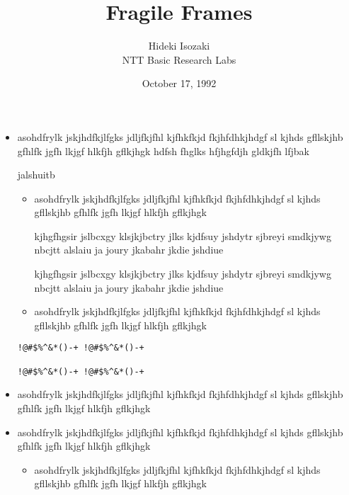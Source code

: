 
\title{Fragile Frames}

\author{Hideki Isozaki\\NTT Basic Research Labs} 

\date{October 17, 1992}




\maketitle

\begin{itemize}
\item asohdfrylk jskjhdfkjlfgks jdljfkjfhl kjfhkfkjd fkjhfdhkjhdgf
sl kjhds gfllskjhb gfhlfk jgfh lkjgf hlkfjh gflkjhgk
hdfsh fhglks hfjhgfdjh gldkjfh lfjbak

\begin{breakbox}
jalshuitb
\begin{itemize}
\item asohdfrylk jskjhdfkjlfgks jdljfkjfhl kjfhkfkjd fkjhfdhkjhdgf
sl kjhds gfllskjhb gfhlfk jgfh lkjgf hlkfjh gflkjhgk

\begin{breakbox}
kjhgfhgsir jslbcxgy klsjkjbctry jlks kjdfsuy
jshdytr sjbreyi smdkjywg nbcjtt alslaiu ja
joury jkabahr jkdie jshdiue

kjhgfhgsir jslbcxgy klsjkjbctry jlks kjdfsuy
jshdytr sjbreyi smdkjywg nbcjtt alslaiu ja
joury jkabahr jkdie jshdiue
\end{breakbox}

\item asohdfrylk jskjhdfkjlfgks jdljfkjfhl kjfhkfkjd fkjhfdhkjhdgf
sl kjhds gfllskjhb gfhlfk jgfh lkjgf hlkfjh gflkjhgk
\end{itemize}
\begin{verbatim}
!@#$%^&*()-+ !@#$%^&*()-+

!@#$%^&*()-+ !@#$%^&*()-+
\end{verbatim}
\end{breakbox}

  \item asohdfrylk jskjhdfkjlfgks jdljfkjfhl kjfhkfkjd fkjhfdhkjhdgf
  sl kjhds gfllskjhb gfhlfk jgfh lkjgf hlkfjh gflkjhgk

  \item asohdfrylk jskjhdfkjlfgks jdljfkjfhl kjfhkfkjd fkjhfdhkjhdgf
  sl kjhds gfllskjhb gfhlfk jgfh lkjgf hlkfjh gflkjhgk

  \begin{itemize}
  \item asohdfrylk jskjhdfkjlfgks jdljfkjfhl kjfhkfkjd fkjhfdhkjhdgf
  sl kjhds gfllskjhb gfhlfk jgfh lkjgf hlkfjh gflkjhgk
\bkcounttrue


\end{itemize}
\end{itemize}
